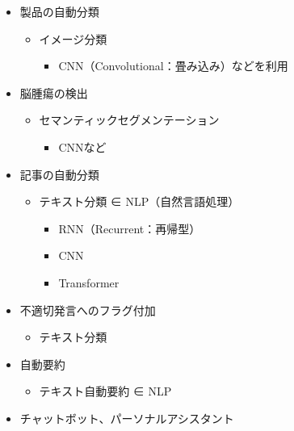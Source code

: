 \begin{itemize}
\tightlist
\item
  製品の自動分類

  \begin{itemize}
  \tightlist
  \item
    イメージ分類

    \begin{itemize}
    \tightlist
    \item
      CNN（Convolutional：畳み込み）などを利用
    \end{itemize}
  \end{itemize}
\item
  脳腫瘍の検出

  \begin{itemize}
  \tightlist
  \item
    セマンティックセグメンテーション

    \begin{itemize}
    \tightlist
    \item
      CNNなど
    \end{itemize}
  \end{itemize}
\item
  記事の自動分類

  \begin{itemize}
  \tightlist
  \item
    テキスト分類 ∈ NLP（自然言語処理）

    \begin{itemize}
    \tightlist
    \item
      RNN（Recurrent：再帰型）
    \item
      CNN
    \item
      Transformer
    \end{itemize}
  \end{itemize}
\item
  不適切発言へのフラグ付加

  \begin{itemize}
  \tightlist
  \item
    テキスト分類
  \end{itemize}
\item
  自動要約

  \begin{itemize}
  \tightlist
  \item
    テキスト自動要約 ∈ NLP
  \end{itemize}
\item
  チャットボット、パーソナルアシスタント


\end{itemize}

